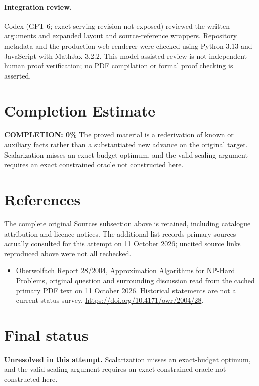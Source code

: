 \documentclass[11pt]{article}
\begin{document}
\paragraph{Integration review.} Codex (GPT-6; exact serving revision not exposed) reviewed the written arguments and expanded layout and source-reference wrappers. Repository metadata and the production web renderer were checked using Python 3.13 and JavaScript with MathJax 3.2.2. This model-assisted review is not independent human proof verification; no PDF compilation or formal proof checking is asserted.

\section{Completion Estimate}
\noindent\textbf{COMPLETION: 0\%}
The proved material is a rederivation of known or auxiliary facts rather than a substantiated new advance on the original target. Scalarization misses an exact-budget optimum, and the valid scaling argument requires an exact constrained oracle not constructed here.
\section{References}
The complete original Sources subsection above is retained, including catalogue attribution and licence notices. The additional list records primary sources actually consulted for this attempt on 11 October 2026; uncited source links reproduced above were not all rechecked.
\begin{itemize}
\item Oberwolfach Report 28/2004, Approximation Algorithms for NP-Hard Problems, original question and surrounding discussion read from the cached primary PDF text on 11 October 2026. Historical statements are not a current-status survey. \url{https://doi.org/10.4171/owr/2004/28}.
\end{itemize}
\section{Final status}
\textbf{Unresolved in this attempt.} Scalarization misses an exact-budget optimum, and the valid scaling argument requires an exact constrained oracle not constructed here.
\end{document}

